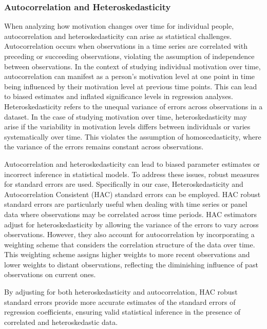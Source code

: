 \documentclass[
  letterpaper,
  number,
  review,
  3p]{elsarticle}
\begin{document}
\subsubsection{Autocorrelation and
Heteroskedasticity}\label{autocorrelation-and-heteroskedasticity}

When analyzing how motivation changes over time for individual people,
autocorrelation and heteroskedasticity can arise as statistical
challenges. Autocorrelation occurs when observations in a time series
are correlated with preceding or succeeding observations, violating the
assumption of independence between observations. In the context of
studying individual motivation over time, autocorrelation can manifest
as a person's motivation level at one point in time being influenced by
their motivation level at previous time points. This can lead to biased
estimates and inflated significance levels in regression analyses.
Heteroskedasticity refers to the unequal variance of errors across
observations in a dataset. In the case of studying motivation over time,
heteroskedasticity may arise if the variability in motivation levels
differs between individuals or varies systematically over time. This
violates the assumption of homoscedasticity, where the variance of the
errors remains constant across observations.

Autocorrelation and heteroskedasticity can lead to biased parameter
estimates or incorrect inference in statistical models. To address these
issues, robust measures for standard errors are used. Specifically in
our case, Heteroskedasticity and Autocorrelation Consistent (HAC)
standard errors can be employed. HAC robust standard errors are
particularly useful when dealing with time series or panel data where
observations may be correlated across time periods. HAC estimators
adjust for heteroskedasticity by allowing the variance of the errors to
vary across observations. However, they also account for autocorrelation
by incorporating a weighting scheme that considers the correlation
structure of the data over time. This weighting scheme assigns higher
weights to more recent observations and lower weights to distant
observations, reflecting the diminishing influence of past observations
on current ones.

By adjusting for both heteroskedasticity and autocorrelation, HAC robust
standard errors provide more accurate estimates of the standard errors
of regression coefficients, ensuring valid statistical inference in the
presence of correlated and heteroskedastic data.
\end{document}
